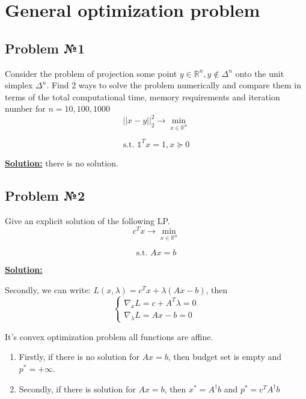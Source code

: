 \section{General optimization problem}
\subsection{Problem №1}
Consider the problem of projection some point $y \in \mathds{R}^n, y \not \in \Delta^n$ onto the unit simplex $\Delta^n$. Find 2 ways to solve the problem numerically and compare them in terms of the total computational time, memory requirements and iteration number for $n = 10, 100, 1000$
\begin{equation*}
    ||x-y||_2^2  \xrightarrow{} \min\limits_{x \in \mathds{R}^n}
\end{equation*}

\begin{equation*}
   \text{s.t. } \mathds{1}^Tx = 1, x \succeq 0
\end{equation*}

\underline{\textbf{Solution:}} there is no solution.

\subsection{Problem №2}
Give an explicit solution of the following LP.
\begin{equation*}
    c^T x  \xrightarrow{} \min\limits_{x \in \mathds{R}^n}
\end{equation*}

\begin{equation*}
   \text{s.t. } Ax = b
\end{equation*}

\underline{\textbf{Solution:}}

Secondly, we can write: $L(x, \lambda) = c^Tx + \lambda(Ax-b)$, then 
\begin{equation*}
    \begin{cases}
    \nabla_x L = c + A^T\lambda = 0 \\
    \nabla_{\lambda} L = Ax - b =0    
    \end{cases}
\end{equation*}


It's convex optimization problem all functions are affine. 

\begin{enumerate}
    \item Firstly, if there is no solution for $Ax = b$, then budget set is empty and $p^* = +\infty$.
    \item Secondly, if there is solution for $Ax = b$, then $x^* = A^{\dag}b$ and $p^* = c^TA^{\dag}b$
\end{enumerate}

